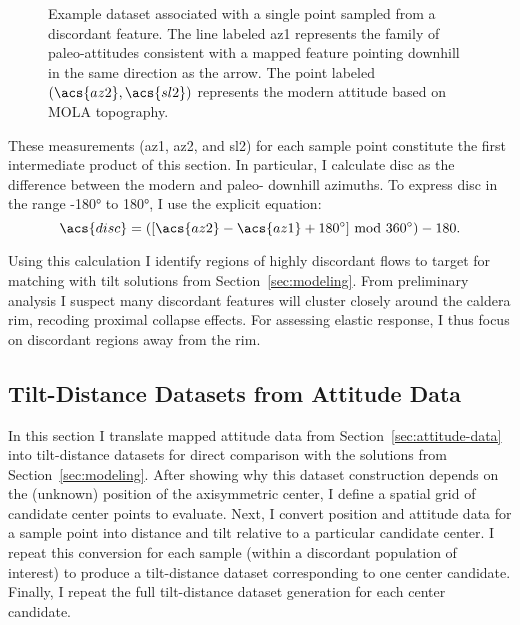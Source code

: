 \begin{figure}
    {\caption[Sample point attitude dataset]{
        Example dataset associated with a single point sampled from a discordant feature. The line labeled \acs{az1} represents the family of paleo-attitudes consistent with a mapped feature pointing downhill in the same direction as the arrow. The point labeled $(\acs{az2},\acs{sl2})$ represents the modern attitude based on \ac{MOLA} topography.
    }\label{fig:attitude-data}}
    {}
\end{figure}

These measurements (\acf{az1}, \acf{az2}, and \acf{sl2}) for each sample point constitute the first intermediate product of this section. In particular, I calculate \acl{disc} as the difference between the modern and paleo- downhill azimuths. To express \ac{disc} in the range \ang{-180} to \ang{180}, I use the explicit equation:
\begin{equation}
    \acs{disc} = ([\acs{az2} - \acs{az1} + \ang{180}] \text{ mod } \ang{360}) - 180.
\end{equation}

Using this calculation I identify regions of highly discordant flows to target for matching with tilt solutions from Section~\ref{sec:modeling}. From preliminary analysis I suspect many discordant features will cluster closely around the caldera rim, recoding proximal collapse effects. %
For assessing elastic response, I thus focus on discordant regions away from the rim.

\subsection{Tilt-Distance Datasets from Attitude Data}\label{sec:tilt-from-map}

In this section I translate mapped attitude data from Section~\ref{sec:attitude-data} into tilt-distance datasets for direct comparison with the solutions from Section~\ref{sec:modeling}. After showing why this dataset construction depends on the (unknown) position of the axisymmetric center, I define a spatial grid of candidate center points to evaluate. Next, I convert position and attitude data for a sample point into distance and tilt relative to a particular candidate center. I repeat this conversion for each sample (within a discordant population of interest) to produce a tilt-distance dataset corresponding to one center candidate. Finally, I repeat the full tilt-distance dataset generation for each center candidate.

